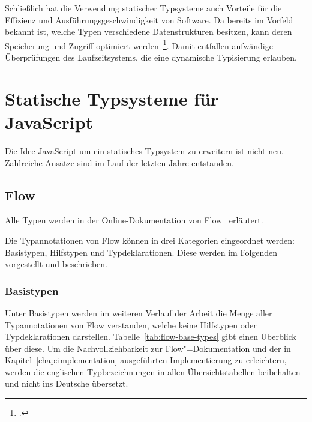 Schließlich hat die Verwendung statischer Typsysteme auch Vorteile für die Effizienz und Ausführungsgeschwindigkeit von Software. Da bereits im Vorfeld bekannt ist, welche Typen verschiedene Datenstrukturen besitzen, kann deren Speicherung und Zugriff optimiert werden~\footcite[Abschnitt 6.1.3]{MITCHELL:CONCEPTS}. Damit entfallen aufwändige Überprüfungen des Laufzeitsystems, die eine dynamische Typisierung erlauben.


\section{Statische Typsysteme für JavaScript}

Die Idee JavaScript um ein statisches Typsystem zu erweitern ist nicht neu. Zahlreiche Ansätze sind im Lauf der letzten Jahre entstanden.


\subsection{Flow}
\label{subsection:flow}

Alle Typen werden in der Online-Dokumentation von Flow~\autocite{FLOW:TYPE_ANNOTATIONS} erläutert.

Die Typannotationen von Flow können in drei Kategorien eingeordnet werden: Basistypen, Hilfstypen und Typdeklarationen. Diese werden im Folgenden vorgestellt und beschrieben.

\subsubsection{Basistypen}
\label{subsection:flow:base-types}

Unter Basistypen werden im weiteren Verlauf der Arbeit die Menge aller Typannotationen von Flow verstanden, welche keine Hilfstypen oder Typdeklarationen darstellen. Tabelle~\ref{tab:flow-base-types} gibt einen Überblick über diese. Um die Nachvollziehbarkeit zur Flow"=Dokumentation und der in Kapitel~\ref{chap:implementation} ausgeführten Implementierung zu erleichtern, werden die englischen Typbezeichnungen in allen Übersichtstabellen beibehalten und nicht ins Deutsche übersetzt.

